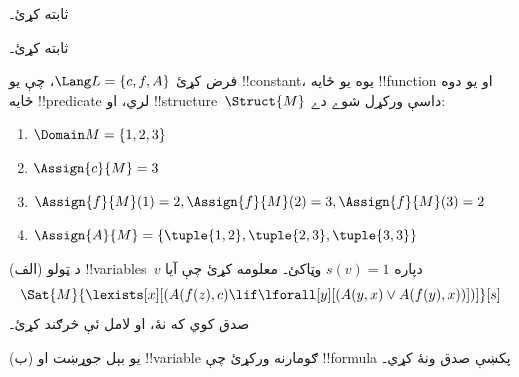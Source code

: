 \documentclass[../../../include/open-logic-section]{subfiles}
\begin{document}

\begin{prob}
   ثابته کړئ۔
\end{prob}
\tagendprob


\begin{prob}
   ثابته کړئ۔
\end{prob}
\tagendprob

\begin{prob}
فرض کړئ $\Lang L = \{c, f, A\}$، چې يو !!{constant}، يوه يو ځايه
!!{function} او يو دوه ځايه !!{predicate} لري، او
!!{structure}~$\Struct{M}$ داسې ورکړل شوے دے:
\begin{enumerate}
\item $\Domain M = \{1, 2, 3\}$
\item $\Assign{c}{M} = 3$
\item $\Assign{f}{M}(1) = 2, \Assign{f}{M}(2) = 3, \Assign{f}{M}(3) = 2$
\item $\Assign{A}{M} = \{\tuple{1, 2}, \tuple{2, 3}, \tuple{3, 3}\}$
\end{enumerate}
(الف) د ټولو !!{variable}s~$v$ دپاره $s(v) = 1$ وټاکئ۔ معلومه کړئ
چې آيا
\[
\Sat{M}{\lexists[x][(A(f(z), c) \lif \lforall[y][(A(y, x) \lor A(f(y),
      x))])]}[s]
\]
صدق کوي که نۀ، او لامل ئې څرګند کړئ۔

(ب) يو بېل جوړښت او !!{variable} ګومارنه ورکړئ چې !!{formula} پکښې
صدق ونۀ کړي۔
\end{prob}
\end{document}
